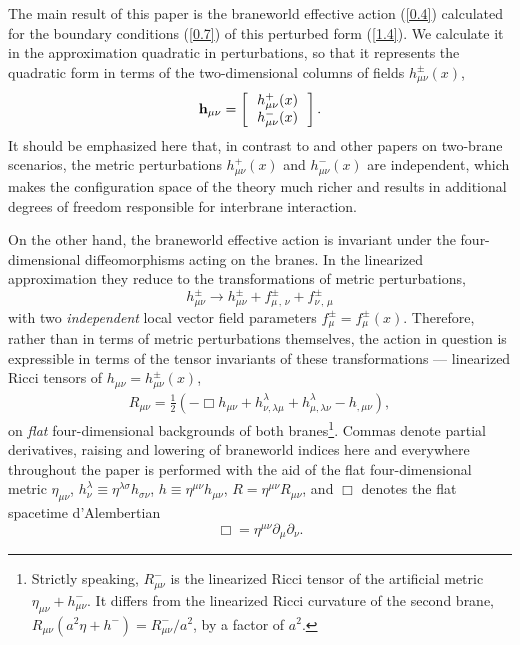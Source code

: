 \documentclass[a4paper,preprint,nofootinbib,
                 showpacs,preprintnumbers,amsmath,amssymb]{revtex4}
\begin{document}
The main result of this paper is the braneworld effective action 
(\ref{0.4}) calculated for the boundary conditions (\ref{0.7}) of 
this perturbed form (\ref{1.4}). We calculate it in the 
approximation quadratic in perturbations, so that it represents 
the quadratic form in terms of the two-dimensional columns of 
fields $h^\pm_{\mu\nu}(x)$, 
  \begin{equation} 
  {\bf h}_{\mu\nu}=\left[\begin{array}{c} 
  \,h_{\mu\nu}^+(x)\, \\ \, h_{\mu\nu}^-(x)\, 
  \end{array}\right].                        \label{1.6} 
  \end{equation} 
It should be emphasized here that, in contrast to \cite{GarPujTan} 
and other papers on two-brane scenarios, the metric perturbations 
$h_{\mu\nu}^+(x)$ and $h_{\mu\nu}^-(x)$ are independent, which 
makes the configuration space of the theory much richer and 
results in additional degrees of freedom responsible for 
interbrane interaction. 
 
On the other hand, the braneworld effective action is invariant under the 
four-dimensional diffeomorphisms acting on the branes. In the linearized 
approximation they reduce to the transformations of metric perturbations, 
   \begin{equation} 
   h^\pm_{\mu\nu}\rightarrow h^\pm_{\mu\nu} 
   +f^\pm_{\mu\,,\,\nu}+f^\pm_{\nu\,,\,\mu}    \label{1.7} 
   \end{equation} 
with two {\em independent} local vector field parameters 
$f_\mu^\pm=f_\mu^\pm(x)$. Therefore, rather than in terms of 
metric perturbations themselves, the action in question is 
expressible in terms of the tensor invariants of these 
transformations --- linearized Ricci tensors of 
$h_{\mu\nu}=h^\pm_{\mu\nu}(x)$, 
  \begin{eqnarray} 
  R_{\mu\nu}=\frac12\left(-\Box h_{\mu\nu} 
  +h^\lambda_{\nu,\lambda\mu} 
  +h^\lambda_{\mu,\lambda\nu}-h_{,\mu\nu}\right),  \label{1.8} 
  \end{eqnarray} 
on {\em flat} four-dimensional backgrounds of both branes\footnote{Strictly 
speaking, $R^-_{\mu\nu}$ is the linearized Ricci tensor of the artificial 
metric $\eta_{\mu\nu}+h^-_{\mu\nu}$. It differs from the linearized Ricci 
curvature of the second brane, $R_{\mu\nu}(a^2\eta+h^-)=R_{\mu\nu}^-/a^2$, 
by a factor of $a^2$.}. Commas denote partial derivatives, raising and 
lowering of braneworld indices here and everywhere throughout the paper 
is performed with the aid of the flat four-dimensional metric $\eta_{\mu\nu}$, 
   $h^\lambda_\nu\equiv 
   \eta^{\lambda\sigma}h_{\sigma\nu}$, 
   $h\equiv\eta^{\mu\nu}h_{\mu\nu}$, 
   $R=\eta^{\mu\nu}R_{\mu\nu}$, 
and $\Box$ denotes the flat spacetime d'Alembertian 
    \begin{equation} 
   \Box=\eta^{\mu\nu}\partial_\mu\partial_\nu.     \label{1.14} 
   \end{equation} 
 
\end{document}
